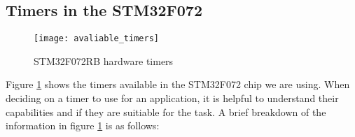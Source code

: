 \documentclass[11pt,fleqn]{book} %
\begin{document}
    \subsection{Timers in the STM32F072}
        \begin{figure}[]
            \centering\texttt{[image: avaliable\_timers]}
            \caption{STM32F072RB hardware timers}
            \label{avaliable_timers}
        \end{figure}
        
        
        Figure \ref{avaliable_timers} shows the timers available in the STM32F072 chip we are using. When deciding on a timer to use for an application, it is helpful to understand their capabilities and if they are suitiable for the task. A brief breakdown of the information in figure \ref{avaliable_timers} is as follows:
        
\end{document}
